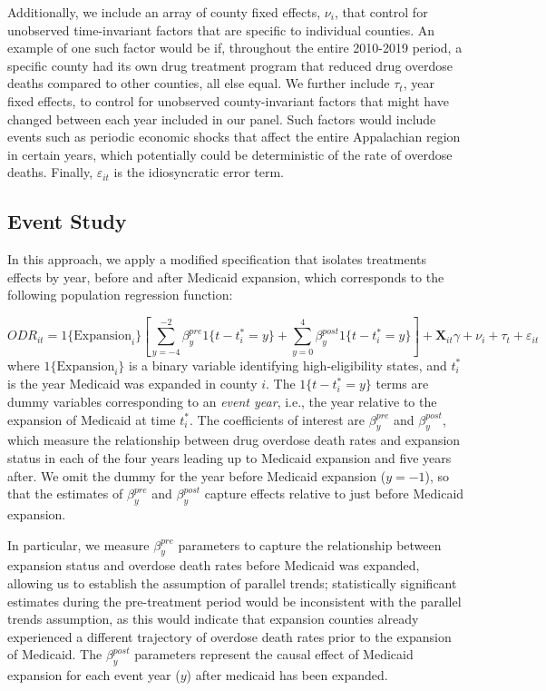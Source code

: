 \documentclass[
  11pt,
]{article}
\begin{document}
Additionally, we include an array of county fixed effects, \(\nu_{i}\),
that control for unobserved time-invariant factors that are specific to
individual counties. An example of one such factor would be if,
throughout the entire 2010-2019 period, a specific county had its own
drug treatment program that reduced drug overdose deaths compared to
other counties, all else equal. We further include \(\tau_{t}\), year
fixed effects, to control for unobserved county-invariant factors that
might have changed between each year included in our panel. Such factors
would include events such as periodic economic shocks that affect the
entire Appalachian region in certain years, which potentially could be
deterministic of the rate of overdose deaths. Finally,
\(\varepsilon_{it}\) is the idiosyncratic error term.

\hypertarget{event-study}{%
\subsection{Event Study}\label{event-study}}

In this approach, we apply a modified specification that isolates
treatments effects by year, before and after Medicaid expansion, which
corresponds to the following population regression function:

\[ODR_{it} =  1\{\text{Expansion}_i\} \left [ \sum_{y=-4}^{-2} \beta_y^{pre} 1\{t - t_i^* = y\} + \sum_{y=0}^{4} \beta_y^{post} 1\{t - t_i^* = y\}\right ] + \textbf{X}_{it} \gamma + \nu_{i} + \tau_{t} + \varepsilon_{it}\]
where \(1\{\text{Expansion}_i\}\) is a binary variable identifying
high-eligibility states, and \(t_i^*\) is the year Medicaid was expanded
in county \(i\). The \(1\{t - t_i^* = y\}\) terms are dummy variables
corresponding to an \emph{event year}, i.e., the year relative to the
expansion of Medicaid at time \(t_i^*\). The coefficients of interest
are \(\beta^{pre}_y\) and \(\beta^{post}_y\), which measure the
relationship between drug overdose death rates and expansion status in
each of the four years leading up to Medicaid expansion and five years
after. We omit the dummy for the year before Medicaid expansion
(\(y = -1\)), so that the estimates of \(\beta^{pre}_y\) and
\(\beta^{post}_y\) capture effects relative to just before Medicaid
expansion.

In particular, we measure \(\beta^{pre}_y\) parameters to capture the
relationship between expansion status and overdose death rates before
Medicaid was expanded, allowing us to establish the assumption of
parallel trends; statistically significant estimates during the
pre-treatment period would be inconsistent with the parallel trends
assumption, as this would indicate that expansion counties already
experienced a different trajectory of overdose death rates prior to the
expansion of Medicaid. The \(\beta^{post}_y\) parameters represent the
causal effect of Medicaid expansion for each event year (\(y\)) after
medicaid has been expanded.
\end{document}
